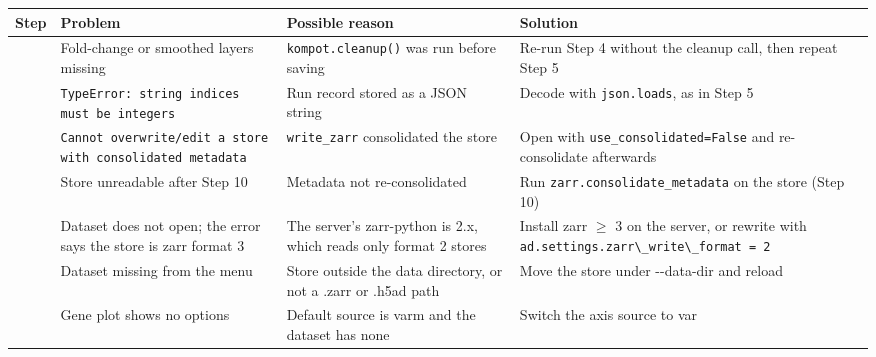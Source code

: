 {\def\LTcaptype{none} %
\begin{longtable}[]{@{}
  >{\raggedright\arraybackslash}p{}
  >{\raggedright\arraybackslash}p{}
  >{\raggedright\arraybackslash}p{}
  >{\raggedright\arraybackslash}p{}@{}}
\toprule\noalign{}
\begin{minipage}[b]{\linewidth}\raggedright
Step
\end{minipage} & \begin{minipage}[b]{\linewidth}\raggedright
Problem
\end{minipage} & \begin{minipage}[b]{\linewidth}\raggedright
Possible reason
\end{minipage} & \begin{minipage}[b]{\linewidth}\raggedright
Solution
\end{minipage} \\
\midrule\noalign{}
\endhead
\bottomrule\noalign{}
\endlastfoot
5 & Fold-change or smoothed layers missing & \texttt{kompot.cleanup()} was run before saving & Re-run Step 4 without the cleanup call, then repeat Step 5 \\
5 & \texttt{TypeError: string indices must be integers} & Run record stored as a JSON string & Decode with \texttt{json.loads}, as in Step 5 \\
10 & \texttt{Cannot overwrite/edit a store with consolidated metadata} & \texttt{write\_zarr} consolidated the store & Open with \texttt{use\_consolidated=False} and re-consolidate afterwards \\
12 & Store unreadable after Step 10 & Metadata not re-consolidated & Run \texttt{zarr.consolidate\_metadata} on the store (Step 10) \\
12 & Dataset does not open; the error says the store is zarr format 3 & The server's zarr-python is 2.x, which reads only format 2 stores & Install zarr $\geq$ 3 on the server, or rewrite with \passthrough{\lstinline!ad.settings.zarr\_write\_format = 2!} \\
12 & Dataset missing from the menu & Store outside the data directory, or not a .zarr or .h5ad path & Move the store under -{}-data-dir and reload \\
18 & Gene plot shows no options & Default source is varm and the dataset has none & Switch the axis source to var \\

\end{longtable}}
